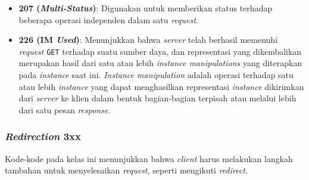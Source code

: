 \begin{itemize}
    \item \textbf{207 (\textit{Multi-Status})}: Digunakan untuk memberikan status terhadap beberapa operasi independen dalam satu \textit{request}.~\cite{RFC4918}
  
  
    \item \textbf{226 (IM \textit{Used})}: Menunjukkan bahwa \textit{server} telah berhasil memenuhi \textit{request} \texttt{GET} terhadap suatu sumber daya, dan representasi yang dikembalikan merupakan hasil dari satu atau lebih \textit{instance manipulations} yang diterapkan pada \textit{instance} saat ini. \textit{Instance manipulation} adalah operasi terhadap satu atau lebih \textit{instance} yang dapat menghasilkan representasi \textit{instance} dikirimkan dari \textit{server} ke klien dalam bentuk bagian-bagian terpisah atau melalui lebih dari satu pesan \textit{response}.~\cite{RFC3229}
  
\end{itemize}

\subsubsection{\textit{Redirection} 3xx}
\label{subsubsec:020104-redirection-3xx}

Kode-kode pada kelas ini menunjukkan bahwa \textit{client} harus melakukan langkah tambahan untuk menyelesaikan \textit{request}, seperti mengikuti \textit{redirect}.

